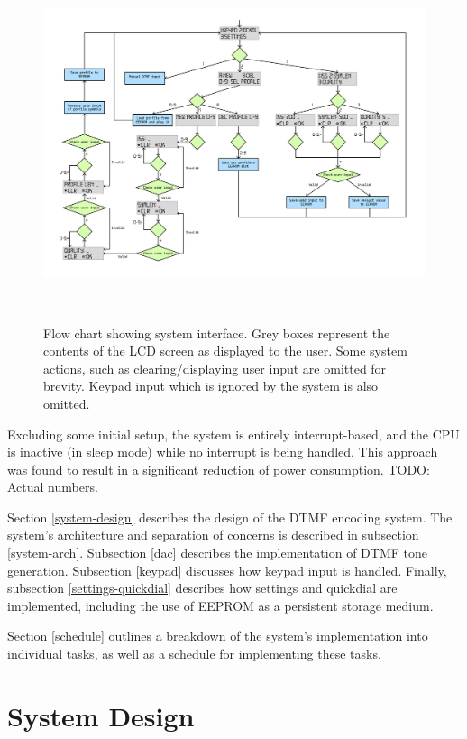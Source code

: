 \documentclass[11pt,a4paper,twocolumn]{scrartcl}
\begin{document}
   \begin{figure}
      \centering
      \includegraphics[height=0.67\textheight, angle=90]{system_flow_chart}
      \caption{Flow chart showing system interface. Grey boxes represent the contents of the LCD screen as displayed to the user. Some system actions, such as clearing/displaying user input are omitted for brevity. Keypad input which is ignored by the system is also omitted.}~\label{fig:system-interface}
   \end{figure}

   Excluding some initial setup, the system is entirely interrupt-based, and the CPU is inactive (in sleep mode) while no interrupt is being handled. This approach was found to result in a significant reduction of power consumption. TODO: Actual numbers.

   Section \ref{system-design} describes the design of the DTMF encoding system. The system's architecture and separation of concerns is described in subsection \ref{system-arch}. Subsection \ref{dac} describes the implementation of DTMF tone generation. Subsection \ref{keypad} discusses how keypad input is handled. Finally, subsection \ref{settings-quickdial} describes how settings and quickdial are implemented, including the use of EEPROM as a persistent storage medium.

   Section \ref{schedule} outlines a breakdown of the system's implementation into individual tasks, as well as a schedule for implementing these tasks.

\section{System Design}~\label{system-design}
\end{document}
